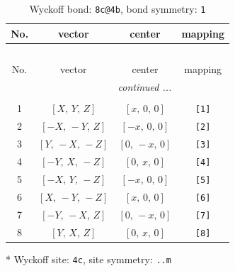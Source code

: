 \documentclass[fleqn,8pt]{jsarticle}
\begin{document}
\renewcommand{\arraystretch}{1.2}
\begin{longtable}{cccc}
\caption{Wyckoff bond: {\tt 8c@4b}, bond symmetry: {\tt 1}}
 \\
 \hline \hline
No. & vector & center & mapping \\ \hline \endfirsthead

\multicolumn{3}{l}{\tablename\ \thetable{}} \\
 \hline \hline
No. & vector & center & mapping \\ \hline \endhead

 \hline \hline
\multicolumn{3}{r}{\footnotesize\it continued ...} \\ \endfoot

 \hline \hline
\multicolumn{3}{r}{} \\ \endlastfoot

1 & $\left[ X,\, Y,\, Z \right]$ & $\left[ x,\, 0,\, 0 \right]$ & {\tt [1]} \\ \hline
2 & $\left[ - X,\, - Y,\, Z \right]$ & $\left[ - x,\, 0,\, 0 \right]$ & {\tt [2]} \\ \hline
3 & $\left[ Y,\, - X,\, - Z \right]$ & $\left[ 0,\, - x,\, 0 \right]$ & {\tt [3]} \\ \hline
4 & $\left[ - Y,\, X,\, - Z \right]$ & $\left[ 0,\, x,\, 0 \right]$ & {\tt [4]} \\ \hline
5 & $\left[ - X,\, Y,\, - Z \right]$ & $\left[ - x,\, 0,\, 0 \right]$ & {\tt [5]} \\ \hline
6 & $\left[ X,\, - Y,\, - Z \right]$ & $\left[ x,\, 0,\, 0 \right]$ & {\tt [6]} \\ \hline
7 & $\left[ - Y,\, - X,\, Z \right]$ & $\left[ 0,\, - x,\, 0 \right]$ & {\tt [7]} \\ \hline
8 & $\left[ Y,\, X,\, Z \right]$ & $\left[ 0,\, x,\, 0 \right]$ & {\tt [8]} \\
\end{longtable}
* Wyckoff site: {\tt 4c}, site symmetry: {\tt ..m}
\renewcommand{\arraystretch}{1.2}
\end{document}
